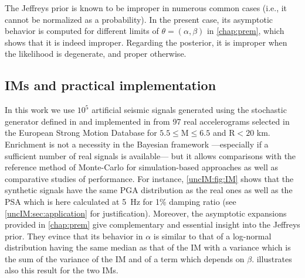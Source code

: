         The Jeffreys prior is known to be improper in numerous common cases (i.e., it cannot be normalized as a probability). In the present case, its asymptotic behavior is computed for different limits of $\theta = (\alpha,\beta)$ in \cref{chap:prem}, which shows that it is indeed improper. 
        Regarding the posterior, it is improper when the likelihood is degenerate, and proper otherwise.

        \subsection{IMs and practical implementation} \label{uncIM:sec:practseism}
        
In this work we use $10^5$ artificial seismic signals generated using the stochastic generator defined in \cite{rezaeian_stochastic_2010} and implemented in \cite{sainct_efficient_2020} from 97 real accelerograms selected in the European Strong Motion Database for $5.5 \leq \text{M} \leq 6.5$ and $\text{R} < 20$ km. Enrichment is not a necessity in the Bayesian framework ---especially if a sufficient number of real signals is available--- but it allows comparisons with the reference method of Monte-Carlo for simulation-based approaches as well as comparative studies of performance. For instance, \cref{uncIM:fig:IM} shows that the synthetic signals have the same PGA distribution as the real ones as well as the PSA which is here calculated at 5~Hz for 1\% damping ratio (see \cref{uncIM:sec:application} for justification). Moreover, the asymptotic expansions provided in \cref{chap:prem} give complementary and essential insight into the Jeffreys prior. They evince that its behavior in $\alpha$ is similar to that of a log-normal distribution having the same median as that of the IM with a variance which is the sum of the variance of the IM and of a term which depends on $\beta$.  illustrates also this result for the two IMs.

